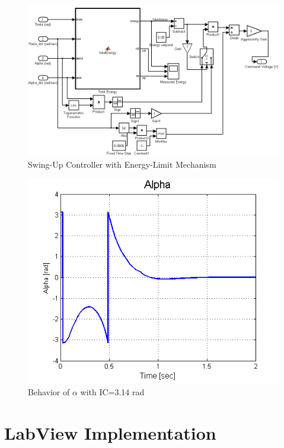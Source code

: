 \documentclass{article}
\theoremstyle{plain}
\theoremstyle{definition}
\theoremstyle{remark}
\begin{document}
\begin{figure}[h!]
\includegraphics[width=1\textwidth]{q5_5.png}
\caption{Swing-Up Controller with Energy-Limit Mechanism} \label{tex}
\label{fig:q5_5}
\end{figure}

\begin{figure}[h!]
\includegraphics[width=1\textwidth]{q5_6.png}
\caption{Behavior of $\alpha$ with IC=3.14 rad} \label{tex}
\label{fig:q5_6}
\end{figure}

\clearpage
\section{LabView Implementation}
\end{document}
